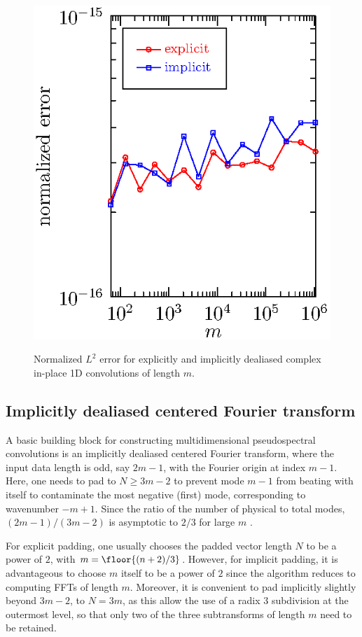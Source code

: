 \documentclass[final]{siamltex}
\begin{document}
\begin{figure}[htbp]
\begin{minipage}{0.49\linewidth}
\begin{center}
\includegraphics{error1c}
\caption{Normalized $L^2$ error for explicitly and implicitly
dealiased complex in-place 1D convolutions of length $m$.}
\label{error1c}
\end{center}
\end{minipage}
\end{figure}

\subsection{Implicitly dealiased centered Fourier transform}\label{fft0}
A basic building block for constructing multidimensional pseudospectral
convolutions is an implicitly dealiased centered Fourier transform, where the
input data length is odd, say $2m-1$, with the Fourier origin at index $m-1$. 
Here, one needs to pad to $N\ge 3m-2$ to prevent 
mode $m-1$ from beating with itself to contaminate the most negative
(first) mode, corresponding to wavenumber $-m+1$. Since the ratio of the
number of physical to total modes, $(2m-1)/(3m-2)$ is asymptotic to $2/3$
for large $m$ \cite{Orszag71}.

For explicit padding, one usually chooses the padded vector length
$N$ to be a power of $2$, with $m=\floor{(n+2)/3}$.
However, for implicit
padding, it is advantageous to choose $m$ itself to be a power of $2$
since the algorithm reduces to computing FFTs of length $m$.
Moreover, it is convenient to pad implicitly slightly beyond $3m-2$, to $N=3m$,
as this allow the use of a radix $3$ subdivision at the outermost level, so
that only two of the three subtransforms of length $m$ need to be retained. 
\end{document}
